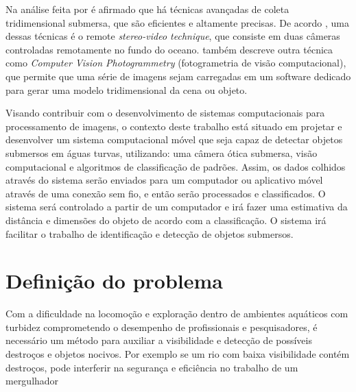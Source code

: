 Na análise feita por  é afirmado que há técnicas avançadas de coleta tridimensional submersa, que são eficientes e altamente precisas. De acordo , uma dessas técnicas é o remote \textit{stereo-video technique}, que consiste em duas câmeras controladas remotamente no fundo do oceano.  também descreve outra técnica como \textit{Computer Vision Photogrammetry} (fotogrametria de visão computacional), que permite que uma série de imagens sejam carregadas em um software dedicado para gerar uma modelo tridimensional da cena ou objeto.


Visando contribuir com o desenvolvimento de sistemas computacionais para processamento de imagens, o contexto deste trabalho está situado em projetar e desenvolver um sistema computacional móvel que seja capaz de detectar objetos submersos em águas turvas, utilizando: uma câmera ótica submersa, visão computacional e algoritmos de classificação de padrões. Assim, os dados colhidos através do sistema serão enviados para um computador ou aplicativo móvel através de uma conexão sem fio, e então serão processados e classificados. O sistema será controlado a partir de um computador e irá fazer uma estimativa da distância e dimensões do objeto de acordo com a classificação. O sistema irá facilitar o trabalho de identificação e detecção de objetos submersos.


\section{Definição do problema} 


Com a dificuldade na locomoção e exploração dentro de ambientes aquáticos com turbidez comprometendo o desempenho de profissionais e pesquisadores, é necessário um método para auxiliar a visibilidade e detecção de possíveis destroços e objetos nocivos. Por exemplo se um rio com baixa visibilidade contém destroços, pode interferir na segurança e eficiência no trabalho de um mergulhador
%

